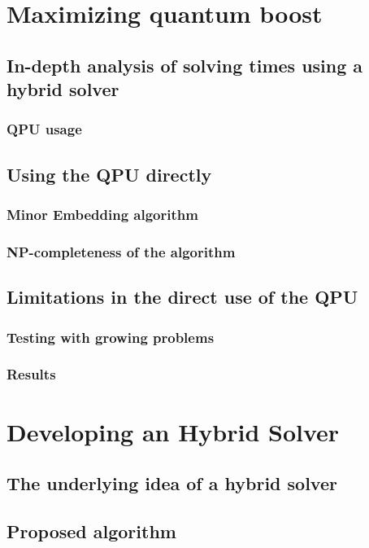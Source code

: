 \documentclass[11pt, oneside]{book}
\begin{document}
\part{Maximizing quantum boost}

\chapter{In-depth analysis of solving times using a hybrid solver}
\section{QPU usage}

\chapter{Using the QPU directly}
\section{Minor Embedding algorithm}
\section{NP-completeness of the algorithm}

\chapter{Limitations in the direct use of the QPU}
\section{Testing with growing problems}
\section{Results}

\part{Developing an Hybrid Solver}

\chapter{The underlying idea of a hybrid solver}

\chapter{Proposed algorithm}
\end{document}
